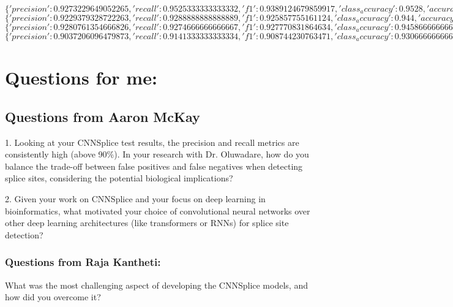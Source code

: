 $\{'precision': 0.9273229649052265, 'recall': 0.9525333333333332, 'f1': 0.9389124679859917, 'class_accuracy': 0.9528, 'accuracy': 0.9527999758720398\}$\\

$\{'precision': 0.9229379328722263, 'recall': 0.9288888888888889, 'f1': 0.925857755161124, 'class_accuracy': 0.944, 'accuracy': 0.9440000057220459\}$\\

$\{'precision': 0.9280761354666826, 'recall': 0.9274666666666667, 'f1': 0.927770831864634, 'class_accuracy': 0.9458666666666666, 'accuracy': 0.9458666443824768\}$\\

$\{'precision': 0.9037206096479873, 'recall': 0.9141333333333334, 'f1': 0.908744230763471, 'class_accuracy': 0.9306666666666666, 'accuracy': 0.9306666851043701\}$



\section{Questions for me:}

\subsection{Questions from Aaron McKay}
1. Looking at your CNNSplice test results, the precision and recall metrics are consistently high (above 90\%). In your research with Dr. Oluwadare, how do you balance the trade-off between false positives and false negatives when detecting splice sites, considering the potential biological implications?

2. Given your work on CNNSplice and your focus on deep learning in bioinformatics, what motivated your choice of convolutional neural networks over other deep learning architectures (like transformers or RNNs) for splice site detection?

\subsubsection{Questions from  Raja Kantheti: }
What was the most challenging aspect of developing the CNNSplice models, and how did you overcome it?